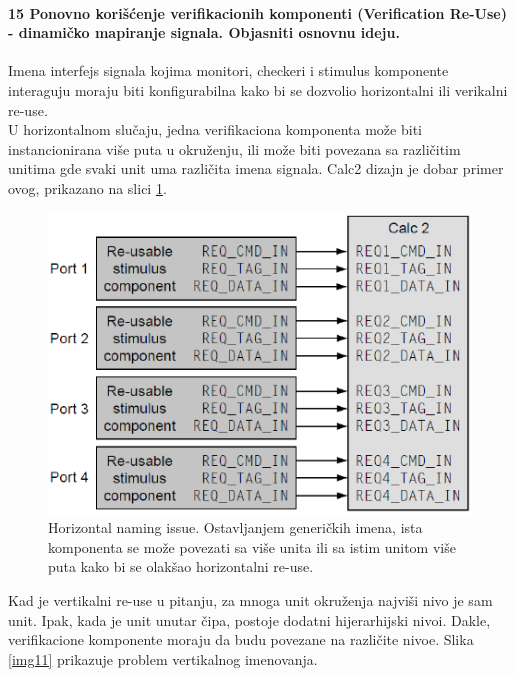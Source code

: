 \documentclass[a4paper, 12pt]{article}
\begin{document}
\paragraph{15 Ponovno korišćenje verifikacionih komponenti (Verification Re-Use) - dinamičko mapiranje signala. Objasniti osnovnu ideju.}
\hfill \break
\indent Imena interfejs signala kojima monitori, checkeri i stimulus komponente interaguju moraju biti konfigurabilna kako bi se dozvolio horizontalni ili verikalni re-use.\\
\indent U horizontalnom slučaju, jedna verifikaciona komponenta može biti instancionirana više puta u okruženju, ili može biti povezana sa različitim unitima gde svaki unit uma različita imena signala. Calc2 dizajn je dobar primer ovog, prikazano na slici \ref{img10}.
\begin{figure}[h!]
\centering
\includegraphics[scale=0.5]{img10.png}
\caption{Horizontal naming issue. Ostavljanjem generičkih imena, ista komponenta se može povezati sa više unita ili sa istim unitom više puta kako bi se olakšao horizontalni re-use.}
\label{img10}
\end{figure}
\indent Kad je vertikalni re-use u pitanju, za mnoga unit okruženja najviši nivo je sam unit. Ipak, kada je unit unutar čipa, postoje dodatni hijerarhijski nivoi. Dakle, verifikacione komponente moraju da budu povezane na različite nivoe. Slika \ref{img11} prikazuje problem vertikalnog imenovanja.
\end{document}
